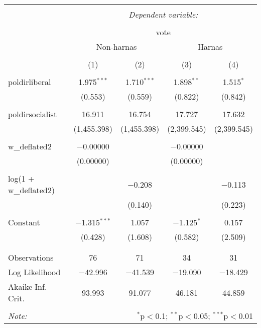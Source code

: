 
\begin{table}[!htbp] \centering 
  \caption{} 
  \label{} 
\begin{tabular}{@{\extracolsep{5pt}}lcccc} 
\\[-1.8ex]\hline 
\hline \\[-1.8ex] 
 & \multicolumn{4}{c}{\textit{Dependent variable:}} \\ 
\cline{2-5} 
\\[-1.8ex] & \multicolumn{4}{c}{vote} \\ 
 & \multicolumn{2}{c}{Non-harnas} & \multicolumn{2}{c}{Harnas} \\ 
\\[-1.8ex] & (1) & (2) & (3) & (4)\\ 
\hline \\[-1.8ex] 
 poldirliberal & 1.975$^{***}$ & 1.710$^{***}$ & 1.898$^{**}$ & 1.515$^{*}$ \\ 
  & (0.553) & (0.559) & (0.822) & (0.842) \\ 
  & & & & \\ 
 poldirsocialist & 16.911 & 16.754 & 17.727 & 17.632 \\ 
  & (1,455.398) & (1,455.398) & (2,399.545) & (2,399.545) \\ 
  & & & & \\ 
 w\_deflated2 & $-$0.00000 &  & $-$0.00000 &  \\ 
  & (0.00000) &  & (0.00000) &  \\ 
  & & & & \\ 
 log(1 + w\_deflated2) &  & $-$0.208 &  & $-$0.113 \\ 
  &  & (0.140) &  & (0.223) \\ 
  & & & & \\ 
 Constant & $-$1.315$^{***}$ & 1.057 & $-$1.125$^{*}$ & 0.157 \\ 
  & (0.428) & (1.608) & (0.582) & (2.509) \\ 
  & & & & \\ 
\hline \\[-1.8ex] 
Observations & 76 & 71 & 34 & 31 \\ 
Log Likelihood & $-$42.996 & $-$41.539 & $-$19.090 & $-$18.429 \\ 
Akaike Inf. Crit. & 93.993 & 91.077 & 46.181 & 44.859 \\ 
\hline 
\hline \\[-1.8ex] 
\textit{Note:}  & \multicolumn{4}{r}{$^{*}$p$<$0.1; $^{**}$p$<$0.05; $^{***}$p$<$0.01} \\ 
\end{tabular} 
\end{table} 

